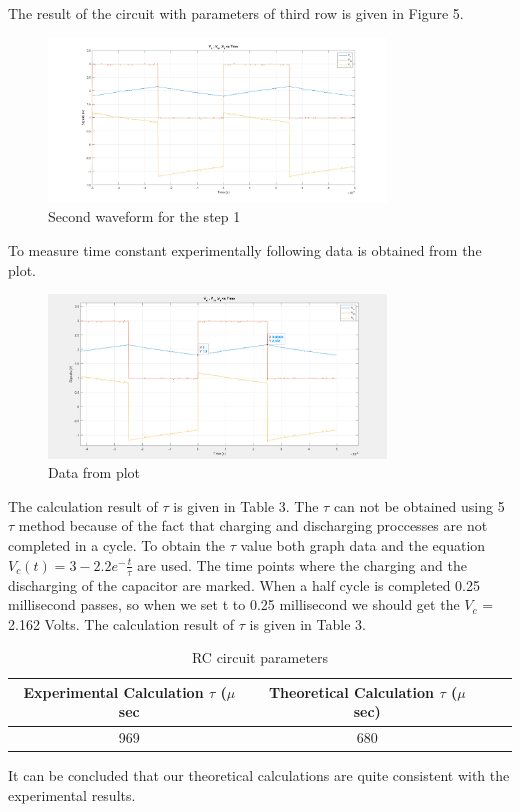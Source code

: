 \documentclass[letterpaper,12pt]{article}
\begin{document}
The result of the circuit with parameters of third row is given in Figure 5.

\begin{figure}[H]
	\centering
   \includegraphics[width=0.8\textwidth]{1a_3.png}
   \caption{Second waveform for the step 1}
\end{figure} 
To measure time constant experimentally following data is obtained from the plot.
\begin{figure}[H]
	\centering
   \includegraphics[width=0.8\textwidth]{1_3_plot_data.png}
   \caption{Data from plot}
\end{figure} 
The calculation result of \(\tau\) is given in Table 3. The \(\tau\) can not be obtained using 5 \(\tau\) method because of the fact that charging and discharging proccesses are not completed in a cycle. To obtain the \(\tau\) value both graph data and the equation \(V_c(t)= 3- 2.2 e^-\frac{t}{\tau}\) are used. The time points where the charging and the discharging of the capacitor are marked. When a half cycle is completed 0.25 millisecond passes, so when we set t to 0.25 millisecond we should get the \(V_c\) = 2.162 Volts. The calculation result of \(\tau\) is given in Table 3.
\begin{table}[H]
	\begin{center}
	\caption{RC circuit parameters}
	\vspace{2mm}
		\begin{tabular}{||c | c | c | c||} 
		 \hline
		 Experimental Calculation \(\tau\) (\(\mu\) sec & Theoretical Calculation \(\tau\) (\(\mu\) sec) \\ [0.5ex] 
		 \hline\hline
		 969 & 680 \\ 
		 \hline
	\end{tabular}
	\end{center}
	\end{table}
It can be concluded that our theoretical calculations are quite consistent with the experimental results.
\end{document}
